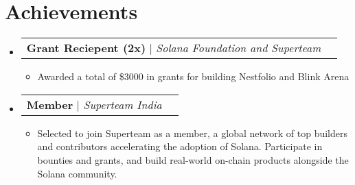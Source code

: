 \documentclass[letterpaper,11pt]{article}
\makeatletter
\newcommand{\resumeItem}[1]{
  \item\small{
    {#1 \vspace{-2pt}}
  }
}
\newcommand{\resumeProjectHeading}[2]{
    \item
    \begin{tabular*}{0.97\textwidth}{l@{\extracolsep{\fill}}r}
      \small#1 & #2 \\
    \end{tabular*}\vspace{-7pt}
}
\newcommand{\resumeSubHeadingListStart}{\begin{itemize}[leftmargin=0.15in, label={}]}
\newcommand{\resumeSubHeadingListEnd}{\end{itemize}}
\newcommand{\resumeItemListStart}{\begin{itemize}}
\newcommand{\resumeItemListEnd}{\end{itemize}\vspace{-5pt}}
\makeatother
\begin{document}
\section{Achievements}
    \resumeSubHeadingListStart
      \resumeProjectHeading
          {\textbf{Grant Reciepent (2x)} $|$ \emph{Solana Foundation and Superteam}}{}
          \resumeItemListStart
            \resumeItem{Awarded a total of \$3000 in grants for building Nestfolio and Blink Arena}
          \resumeItemListEnd
      \resumeProjectHeading
          {\textbf{Member} $|$ \emph{Superteam India}}{}
          \resumeItemListStart
                \resumeItem{Selected to join Superteam as a member, a global network of top builders and contributors accelerating the adoption of Solana. Participate in bounties and grants, and build real-world on-chain products alongside the Solana community.}
          \resumeItemListEnd
    \resumeSubHeadingListEnd



\end{document}
